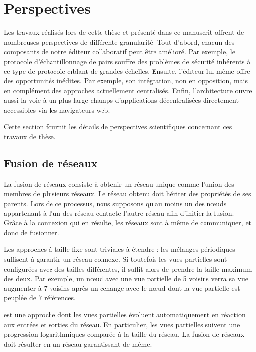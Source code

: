 
\section{Perspectives}
\label{conclu:sec:perspectives}

Les travaux réalisés lors de cette thèse et présenté dans ce manuscrit offrent
de nombreuses perspectives de différente granularité. Tout d'abord, chacun des
composants de notre éditeur collaboratif peut être amélioré. Par exemple, le
protocole d'échantillonnage de pairs \SPRAY souffre des problèmes de sécurité
inhérents à ce type de protocole ciblant de grandes échelles. Ensuite, l'éditeur
lui-même offre des opportunités inédites. Par exemple, son intégration, non en
opposition, mais en complément des approches actuellement centralisés. Enfin,
l'architecture ouvre aussi la voie à un plus large champs d'applications
décentralisées directement accessibles via les navigateurs web.

Cette section fournit les détails de perspectives scientifiques concernant ces
travaux de thèse.

\subsection{Fusion de réseaux}

\label{conclu:subsec:merging}

La fusion de réseaux consiste à obtenir un réseau unique comme l'union des
membres de plusieurs réseaux. Le réseau obtenu doit hériter des propriétés de
ses parents.  Lors de ce processus, nous supposons qu'au moins un des nœuds
appartenant à l'un des réseau contacte l'autre réseau afin d'initier la
fusion. Grâce à la connexion qui en résulte, les réseaux sont à même de
communiquer, et donc de fusionner.

Les approches à taille fixe sont triviales à étendre : les mélanges périodiques
suffisent à garantir un réseau connexe. Si toutefois les vues partielles sont
configurées avec des tailles différentes, il suffit alors de prendre la taille
maximum des deux. Par exemple, un nœud avec une vue partielle de 5 voisins verra
sa vue augmenter à $7$ voisins après un échange avec le nœud dont la vue
partielle est peuplée de $7$ références.

\SPRAY est une approche dont les vues partielles évoluent automatiquement en
réaction aux entrées et sorties du réseau. En particulier, les vues partielles
suivent une progression logarithmiques comparée à la taille du réseau. La fusion
de réseaux \SPRAY doit résulter en un réseau \SPRAY garantissant de même.

